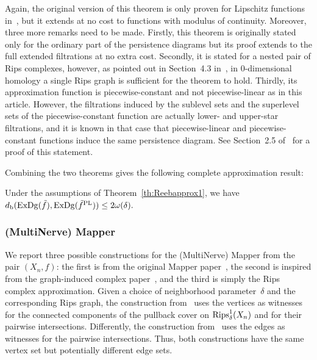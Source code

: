 Again, the original version of this theorem is only proven for Lipschitz functions %
in~\cite{Chazal09b}, but it extends at no cost
to functions with modulus of continuity.
Moreover, three more remarks need to be made. %
Firstly, %
this theorem is originally stated only for the ordinary part of the
persistence diagrams but its proof extends to the full extended
filtrations at no extra cost. Secondly, it is stated for a
nested pair of Rips complexes, however, as pointed out
in Section~4.3 in~\cite{Chazal09b}, in 0-dimensional homology a single Rips graph
is sufficient for the theorem to hold. 
Thirdly, its approximation function is piecewise-constant and not piecewise-linear
as in this article.
However, the filtrations induced by the sublevel sets and the superlevel sets of the piecewise-constant function
are actually lower- and upper-star filtrations,
and it is known in that case that piecewise-linear and piecewise-constant functions induce the same persistence diagram.
See Section~2.5 of~\cite{Morozov08} for a proof of this statement.

Combining the two theorems gives the following complete approximation result: 
\begin{thm}\label{th:Reebapprox}
Under the assumptions of Theorem~\ref{th:Reebapprox1}, we have $d_{\rm b}(\mathrm{ExDg}(\tilde{f}),\mathrm{ExDg}({\tilde{f}}^{\rm PL}))\leq 2\omega(\delta).$
\end{thm}

\subsubsection*{(MultiNerve) Mapper}
\label{sec:Mapper_constr}

We report three possible constructions for the (MultiNerve) Mapper from
the pair $(X_n, f)$: the first is from the original Mapper
paper~\cite{Singh07}, the second is inspired from the graph-induced complex
paper~\cite{Dey13b}, and the third is simply the Rips complex approximation.  
%
Given a choice of neighborhood parameter~$\delta$ and the
corresponding Rips graph, the construction
from~\cite{Singh07} uses the vertices as witnesses for the connected components of the
pullback cover on $\mathrm{Rips}^1_\delta(X_n)$ and for their pairwise
intersections. Differently, the construction from~\cite{Dey13b} uses
the edges as witnesses for the pairwise intersections. Thus, both
constructions have the same vertex set but potentially different edge sets. 

